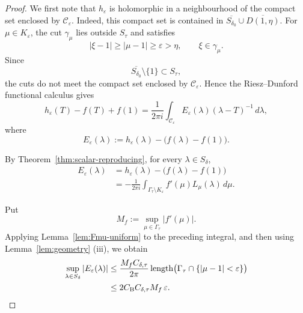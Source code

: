 \documentclass[11pt]{amsart}
\numberwithin{equation}{section}
\theoremstyle{definition}
\theoremstyle{plain}
\begin{document}
\begin{proof}
We first note that \(h_\varepsilon\) is holomorphic in a neighbourhood
of the compact set enclosed by \(\mathcal C_\varepsilon\).
Indeed, this compact set is contained in
\(
        \overline{S_{\delta_0}}\cup\overline{D(1,\eta)}.
\)
For \(\mu\in K_\varepsilon\), the cut \(\gamma_\mu\) lies outside
\(S_\tau\) and satisfies
\[
        |\xi-1|\ge|\mu-1|\ge\varepsilon>\eta,
        \qquad \xi\in\gamma_\mu.
\]
Since
\[
        \overline{S_{\delta_0}}\setminus\{1\}\subset S_\tau,
\]
the cuts do not meet the compact set enclosed by
\(\mathcal C_\varepsilon\).
Hence the Riesz--Dunford functional calculus gives
\[
        h_\varepsilon(T)-f(T)+f(1)
        =
        \frac{1}{2\pi i}
        \int_{\mathcal C_\varepsilon}
        E_\varepsilon(\lambda)(\lambda -T)^{-1}\,d\lambda ,
\]
where
\[
        E_\varepsilon(\lambda)
        :=
        h_\varepsilon(\lambda)-\bigl(f(\lambda)-f(1)\bigr).
\]


By Theorem~\ref{thm:scalar-reproducing}, for every
$\lambda\in S_\delta$,
\[
\begin{aligned}
    E_\varepsilon(\lambda)
    &=
    h_\varepsilon(\lambda)
    -
    \bigl(f(\lambda)-f(1)\bigr)
    \\
    &=
    -\frac{1}{2\pi i}
    \int_{\Gamma_\tau\setminus K_\varepsilon}
         f'(\mu)L_\mu(\lambda)\,d\mu.
\end{aligned}
\]


Put
\[
    M_f:=\sup_{\mu\in\Gamma_\tau}|f'(\mu)|.
\]
Applying Lemma~\ref{lem:Fmu-uniform} to the preceding integral, and then
using Lemma~\ref{lem:geometry} \textup{(iii)}, we obtain
\[
\begin{aligned}
    \sup_{\lambda\in S_\delta}|E_\varepsilon(\lambda)|
    &\le
    \frac{M_fC_{\delta,\tau}}{2\pi}
    \operatorname{length}
    \bigl(
        \Gamma_\tau\cap\{|\mu-1|<\varepsilon\}
    \bigr)
    \\
    &\le
    2C_{\rm B}C_{\delta,\tau}M_f\,\varepsilon.
\end{aligned}
\]



\end{proof}
\end{document}
